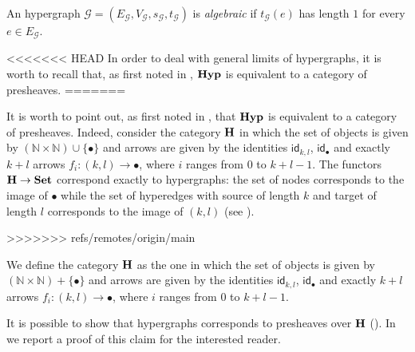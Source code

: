 \documentclass[3p]{elsarticle}
\newcommand{\Set}{\mathbf{Set}}
\newcommand{\catname}[1]{\textbf{\textup{#1}}}
\newcommand{\hyp}{\catname{Hyp}}
\newcommand{\id}[1]{\mathsf{id}_{#1}}
\theoremstyle{remark}
\theoremstyle{definition}
\begin{document}
\begin{defi}
An hypergraph $\mathcal{G}=(E_{\mathcal{G}}, V_{\mathcal{G}}, s_{\mathcal{G}}, t_{\mathcal{G}})$ is \emph{algebraic} if $t_{\mathcal{G}}(e)$ has length $1$ for every $e\in E_{\mathcal{G}}$.
\end{defi}
 
<<<<<<< HEAD
In order to deal with general limits of hypergraphs, it is worth to recall that, as first noted in \cite{bonchi2022string}, $\hyp$ is equivalent to a category of presheaves. 
=======
 
\begin{rem}\label{rem:functor}
	It is worth to point out, as first noted in \cite{bonchi2022string}, that $\hyp$ is equivalent to a category of presheaves. 
	Indeed, consider the category $\catname{H}$ in which the set of objects is given by $ (\mathbb{N}\times \mathbb{N}) \cup \{\bullet\}$ and arrows are given by the identities $\id{k,l}$, $\id{\bullet}$ and exactly $k+l$ arrows $f_i\colon (k,l)\rightarrow \bullet$, where $i$ ranges from $0$ to $k+l-1$. 
	The functors $\catname{H}\to \Set$ correspond exactly to hypergraphs: the set of nodes corresponds to the image of $\bullet$ while the set of hyperedges with source of length $k$ and target of length $l$ corresponds to the image of $(k,l)$ (see \cite{CastelnovoGM24}).
\end{rem}
>>>>>>> refs/remotes/origin/main

\begin{defi} We define the category $\catname{H}$  as the one in which the set of objects is given by $ (\mathbb{N}\times \mathbb{N}) + \{\bullet\}$ and arrows are given by the identities $\id{k,l}$, $\id{\bullet}$ and exactly $k+l$ arrows $f_i\colon (k,l)\rightarrow \bullet$, where $i$ ranges from $0$ to $k+l-1$. 
\end{defi}

It is possible to show that hypergraphs corresponds to presheaves over $\catname{H}$ (\cite{bonchi2022string,castelnovo2023thesis,CastelnovoGM24}). In  we report a proof of this claim for the interested reader.
\end{document}
